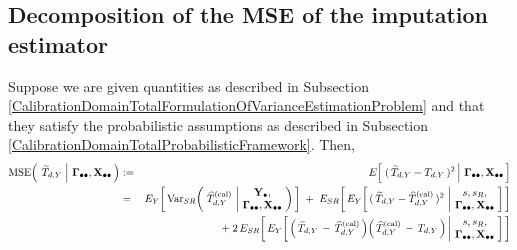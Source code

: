 
\vskip 0.5cm
\subsection{Decomposition of the MSE of the imputation estimator}
\setcounter{theorem}{0}


\vskip 0.1cm
\begin{lemma}
\label{CalibrationDomainTotalDecompositionMSETtilde}
\mbox{}
\vskip 0.1cm
\noindent
Suppose we are given quantities as described in Subsection
\ref{CalibrationDomainTotalFormulationOfVarianceEstimationProblem}
and
that they satisfy the probabilistic assumptions as described in Subsection
\ref{CalibrationDomainTotalProbabilisticFramework}.
\vskip 0.1cm
\noindent
Then,
\begin{eqnarray*}
\MSE\!\left(\;
    \left.
    \widetilde{T}_{d,Y}
    \;\right\vert\,
    \Gdotdot,\Xobs
    \,\right)
& := &
    E\!\left[\,
        \left.
        (\,\widetilde{T}_{d,Y} - T_{d,Y}\,)^{2}
        \,\right\vert\,
        \Gdotdot,\Xobs
        \,\right]
\\
& = &
    E_{Y}\!\left[\,
    \Var_{SR}\!\left(\;
        \widehat{T}^{\textnormal{(cal)}}_{d,Y}
        \,\left\vert\!
        \begin{array}{c} \Ydot, \\ \Gdotdot,\Xobs \end{array}
        \right.
        \!\!\right)
        \,\right]
    \;+\;
    E_{SR}\!\left[\,
    E_{Y}\!\left[\,
        (\,\widetilde{T}_{d,Y} - \widehat{T}^{\textnormal{(cal)}}_{d,Y}\,)^{2}
        \,\left\vert\!
        \begin{array}{c} s,s_{R}, \\ \Gdotdot,\Xobs \end{array}
        \right.
        \!\!\right]
        \,\right]
\\
&&
    \; + \; 2 \,
    E_{SR}\!\left[\,
    E_{Y}\!\left[\,
        \left(\,\widetilde{T}_{d,Y} \,-\, \widehat{T}^{\textnormal{(cal)}}_{d,Y}\,\right)
        \!
        \left(\,\widehat{T}^{\textnormal{(cal)}}_{d,Y} \,-\, T_{d,Y}\,\right)
        \left\vert\!
        \begin{array}{c} s,s_{R}, \\ \Gdotdot,\Xobs \end{array}
        \right.
        \!\!\right]
        \,\right]
\end{eqnarray*}
\end{lemma}
